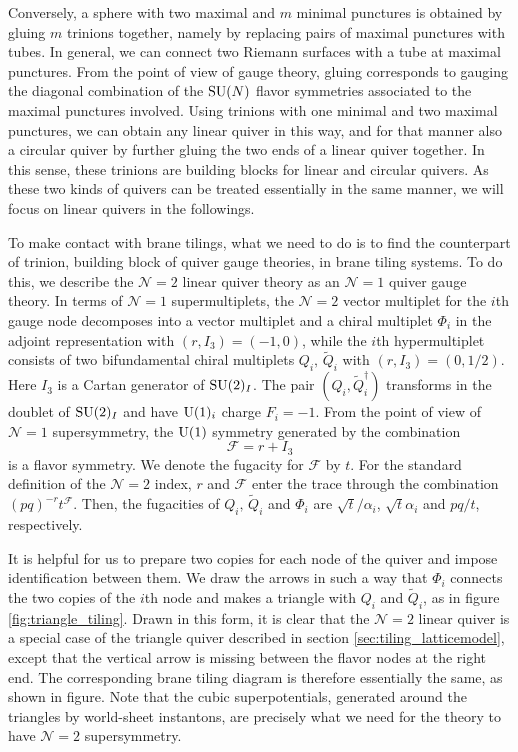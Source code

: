 Conversely, a sphere with two maximal and $m$ minimal punctures is
obtained by gluing $m$ trinions together, namely by replacing pairs
of maximal punctures with tubes. In general, we can connect two Riemann
surfaces with a tube at maximal punctures. From the point of view
of gauge theory, gluing corresponds to gauging the diagonal combination
of the $\mathrm{SU}(N)$ flavor symmetries associated to the maximal punctures
involved. Using trinions with one minimal and two maximal punctures,
we can obtain any linear quiver in this way, and for that manner also
a circular quiver by further gluing the two ends of a linear quiver
together. In this sense, these trinions are building blocks for linear
and circular quivers. As these two kinds of quivers can be treated
essentially in the same manner, we will focus on linear quivers in
the followings.

To make contact with brane tilings, what we need to do is to find
the counterpart of trinion, building block of quiver gauge theories,
in brane tiling systems. To do this, we describe the $\mathcal{N}=2$
linear quiver theory as an $\mathcal{N}=1$ quiver gauge theory. In
terms of $\mathcal{N}=1$ supermultiplets, the $\mathcal{N}=2$ vector
multiplet for the $i$th gauge node decomposes into a vector multiplet
and a chiral multiplet $\Phi_{i}$ in the adjoint representation with
$(r,I_{3})=(-1,0)$, while the $i$th hypermultiplet
consists of two bifundamental chiral multiplets $Q_{i},\,\tilde{Q}_{i}$
with $(r,I_{3})=(0,1/2)$. Here $I_{3}$ is
a Cartan generator of $\mathrm{SU}(2)_{I}$. The pair $(Q_{i},\tilde{Q}_{i}^{\dagger})$
transforms in the doublet of $\mathrm{SU}(2)_{I}$ and have $\mathrm{U}(1)_{i}$ charge
$F_{i}=-1$. From the point of view of $\mathcal{N}=1$ supersymmetry,
the $\mathrm{U}(1)$ symmetry generated by the combination
\begin{equation}
    \mathcal{F} = r + I_{3}
\end{equation}
is a flavor symmetry. We denote the fugacity for $\mathcal{F}$ by
$t$. For the standard definition of the $\mathcal{N}=2$ index, $r$
and $\mathcal{F}$ enter the trace through the combination $(pq)^{-r}t^{\mathcal{F}}$.
Then, the fugacities of $Q_{i},\,\tilde{Q}_{i}$ and $\Phi_{i}$ are
$\sqrt{t}/\alpha_{i}$, $\sqrt{t}\alpha_{i}$ and $pq/t$, respectively.

It is helpful for us to prepare two copies for each node of the quiver
and impose identification between them. We draw the arrows in such
a way that $\Phi_{i}$ connects the two copies of the $i$th node
and makes a triangle with $Q_{i}$ and $\tilde{Q}_{i}$, as in figure \ref{fig:triangle_tiling}.
Drawn in this form, it is clear that the $\mathcal{N}=2$ linear quiver
is a special case of the triangle quiver described in section \ref{sec:tiling_latticemodel},
except that the vertical arrow is missing between the flavor nodes
at the right end. The corresponding brane tiling diagram is therefore
essentially the same, as shown in figure. Note that the cubic superpotentials,
generated around the triangles by world-sheet instantons, are precisely
what we need for the theory to have $\mathcal{N}=2$ supersymmetry.


